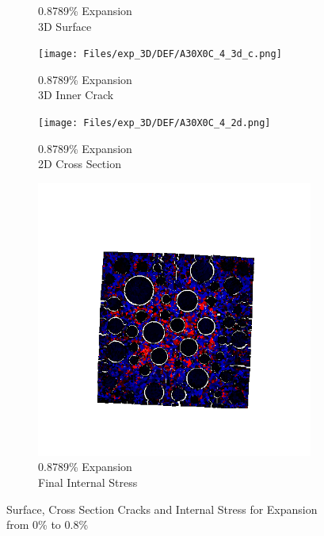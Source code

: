 \begin{figure}[ht!]
\begin{subfigure}{.25\textwidth}
      \caption{0.8789\% Expansion\\3D Surface}
    \end{subfigure}%
    \begin{subfigure}{.25\textwidth}
      \centering
      \texttt{[image: Files/exp\_3D/DEF/A30X0C\_4\_3d\_c.png]}
      \caption{0.8789\% Expansion\\3D Inner Crack}
    \end{subfigure}%
    \begin{subfigure}{.25\textwidth}
      \centering
      \texttt{[image: Files/exp\_3D/DEF/A30X0C\_4\_2d.png]}
      \caption{0.8789\% Expansion\\2D Cross Section}
    \end{subfigure}%
    \begin{subfigure}{.25\textwidth}
      \centering
      \includegraphics[width=.8\linewidth]{Files/exp_3D/DEF/A30X0C_4_stress.png}
      \caption{0.8789\% Expansion\\Final Internal Stress}
    \end{subfigure}

\caption{Surface, Cross Section Cracks and Internal Stress for Expansion from 0\% to 0.8\%}
\label{fig:DEF_A30_X0C_3D_exp}
\end{figure}


